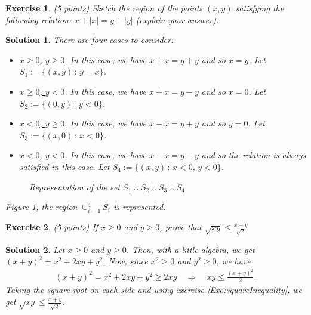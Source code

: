 \documentclass[12pt]{article}
\newcommand{\Ra}{\Rightarrow}
\theoremstyle{plain}
\newtheorem{exer}{\textbf{Exercise}}}
\theoremstyle{plain}
\newtheorem*{sol}{\textbf{Solution}}}
\theoremstyle{plain}
\theoremstyle{plain}
\begin{document}
\begin{exer}
(5 points)
Sketch the region of the points $(x,y)$ satisfying the following relation: $x + |x| = y + |y|$ (explain your answer).
\end{exer}
\begin{sol}
There are four cases to consider:
	\begin{itemize}
	\item \underline{$x \geq 0$, $y \geq 0$}. In this case, we have $x + x = y + y$ and so $x = y$. Let $S_1:= \{ (x, y) \, : \, y = x \}$.
	\item \underline{$x \geq 0$, $y < 0$}. In this case, we have $x + x = y - y$ and so $x = 0$. Let $S_2 := \{ (0, y) \, : \, y < 0 \}$.
	\item \underline{$x < 0$, $y \geq 0$}. In this case, we have $x - x = y + y$ and so $y = 0$. Let $S_3:= \{ (x, 0) \, : \, x < 0 \}$.
	\item \underline{$x < 0$, $y < 0$}. In this case, we have $x - x = y - y$ and so the relation is always satisfied in this case. Let $S_4:=\{ (x, y) \, : \, x < 0, \, y < 0\}$.
	\end{itemize}

	\begin{figure}
	\centering
	\caption{Representation of the set $S_1 \cup S_2 \cup S_3 \cup S_4$}\label{fig:GraphOfRegion}
	\end{figure}
Figure \ref{fig:GraphOfRegion}, the region $\cup_{i = 1}^4 S_i$ is represented.
\end{sol}

\begin{exer}
(5 points)
If $x \geq 0$ and $y \geq 0$, prove that $\sqrt{xy} \leq \frac{x + y}{\sqrt{2}}$
\end{exer}
\begin{sol}
Let $x \geq 0$ and $y \geq 0$. Then, with a little algebra, we get $(x + y)^2 = x^2 + 2xy + y^2$. Now, since $x^2 \geq 0$ and $y^2 \geq 0$, we have 
	\begin{align*}
	(x + y)^2 = x^2 + 2xy + y^2 \geq 2xy \quad \Ra \quad xy \leq \frac{(x + y)^2}{2} .
	\end{align*}
Taking the square-root on each side and using exercise \ref{Exo:squareInequality}, we get $\sqrt{xy} \leq \frac{x + y}{\sqrt{2}}$.
\end{sol}
\end{document}
